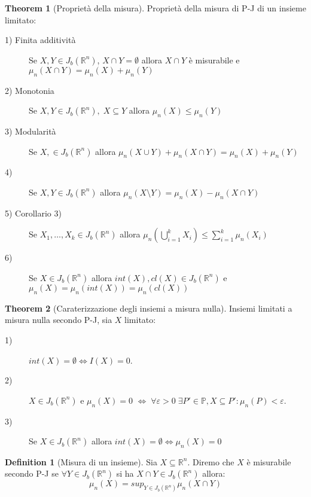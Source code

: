 \documentclass[leqno]{article}
\theoremstyle{definition}
\newtheorem{definition}{Definition}[section]
\numberwithin{equation}{section}
\newtheorem{theorem}{Theorem}[section]
\theoremstyle{remark}
\begin{document}
	\begin{theorem}[Proprietà della misura]
		Proprietà della misura di P-J di un insieme limitato:
		\begin{description}
			\item[1) Finita additività] Se $X,Y\in J_b(\mathbb{R}^n)$, $X\cap Y = \emptyset$ allora $X\cap Y$ è misurabile e $\mu_n(X\cap Y)=\mu_n(X)+\mu_n(Y)$
			\item[2) Monotonia] Se $X,Y\in J_b(\mathbb{R}^n), \; X \subseteq Y$ allora $\mu_n(X)\le\mu_n(Y)$
			\item[3) Modularità] Se $X,\in J_b(\mathbb{R}^n)$ allora $\mu_n(X\cup Y)+\mu_n(X\cap Y)=\mu_n(X)+\mu_n(Y)$
			\item [4)] Se $X,Y\in J_b(\mathbb{R}^n)$ allora $\mu_n(X \setminus Y)=\mu_n(X)-\mu_n(X\cap Y)$
			\item [5) Corollario 3) ] Se $X_1,\dots, X_k \in J_b(\mathbb{R}^n)$ allora $\mu_n \left(\bigcup_{i=1}^k X_i\right)\le \sum_{i=1}^k \mu_n(X_i) $
			\item[6) ] Se $X\in J_b(\mathbb{R}^n)$ allora $int(X),cl(X)\in J_b(\mathbb{R}^n)$ e $\mu_n(X)=\mu_n(int(X))=\mu_n(cl(X))$
		\end{description}
	\end{theorem}
	\begin{theorem}[Caraterizzazione degli insiemi a misura nulla]
		Insiemi limitati a misura nulla secondo P-J, sia $X$ limitato:
		\begin{description}
			\item[1)] $int(X)=\emptyset \Leftrightarrow I(X)=0$.
			\item[2)] $X\in J_b(\mathbb{R}^n)$ e $\mu_n(X)=0$ $\Leftrightarrow \; \forall \varepsilon > 0 \; \exists P'\in \mathbb{P}, X \subseteq P' : \mu_n(P)<\varepsilon$. 
			\item[3)] Se $X \in J_b(\mathbb{R}^n)$ allora $int(X)=\emptyset \Leftrightarrow \mu_n(X)=0$
		\end{description}
	\end{theorem}
	
	\begin{definition}[Misura di un insieme]
		Sia $X\subseteq \mathbb{R}^n$. Diremo che $X$ è misurabile secondo P-J se $\forall Y \in J_b(\mathbb{R}^n)$ si ha $X \cap Y \in J_b(\mathbb{R}^n)$ allora:
		\begin{equation}
			\mu_n(X)=sup_{Y \in J_b(\mathbb{R}^n)}\mu_n(X \cap Y)
		\end{equation}
	\end{definition}
	
\end{document}
